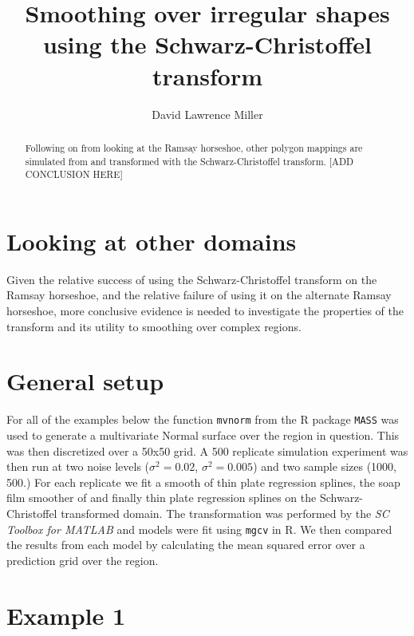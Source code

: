 \documentclass[a4paper,10pt]{amsart}
\title{Smoothing over irregular shapes using the Schwarz-Christoffel transform}
\author{David Lawrence Miller}
\newcommand{\sch}{Schwarz-Christoffel }
\begin{document}
\begin{abstract}
Following on from looking at the Ramsay horseshoe, other polygon mappings are simulated from and transformed with the \sch transform. [ADD CONCLUSION HERE]
\end{abstract}


\newtheorem{thm}{Theorem}[section]

\newtheorem{defn}{Definition}[section]

\maketitle



\section{Looking at other domains}

Given the relative success of using the \sch transform on the Ramsay horseshoe, and the relative failure of using it on the alternate Ramsay horseshoe, more conclusive evidence is needed to investigate the properties of the transform and its utility to smoothing over complex regions.





\section{General setup}

For all of the examples below the function \texttt{mvnorm} from the \textsf{R} package \texttt{MASS} was used to generate a  multivariate Normal surface over the region in question. This was then discretized over a 50x50 grid. A 500 replicate simulation experiment was then run at two noise levels ($\sigma^2=0.02$, $\sigma^2=0.005$) and two sample sizes (1000, 500.) For each replicate we fit a smooth of thin plate regression splines, the soap film smoother of \cite{soap} and finally thin plate regression splines on the \sch transformed domain. The transformation was performed by the \textit{SC Toolbox for MATLAB} and models were fit using \texttt{mgcv} in \textsf{R}. We then compared the results from each model by calculating the mean squared error over a prediction grid over the region.

\section{Example 1}
\end{document}
